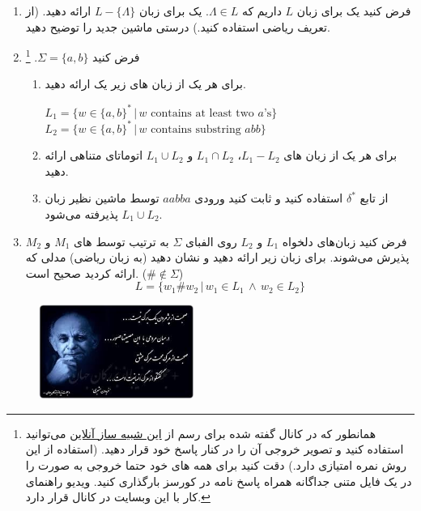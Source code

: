 \documentclass{article}
\begin{document}
	\begin{enumerate}
		\item 
		فرض کنید یک  برای زبان $L$ داریم که $\Lambda \in L $. یک  برای زبان 
		 $L-\{\Lambda\}$
		  ارائه دهید. (از تعریف ریاضی  استفاده کنید.) درستی ماشین جدید را توضیح دهید.
		\item 
		فرض کنید $\Sigma = \{a, b \}$. 
		\footnote{
			همانطور که در کانال گفته شده برای رسم
		از
		\href{https://automatonsimulator.com/}{این شبیه ساز آنلاین}
		می‌توانید استفاده کنید و تصویر خروجی آن را در کنار پاسخ خود قرار دهید. (استفاده از این روش نمره امتیازی دارد.) دقت کنید برای همه های خود حتما خروجی به صورت
		را در یک فایل متنی جداگانه همراه پاسخ نامه در کورسز بارگذاری کنید. ویدیو راهنمای کار با این وبسایت در کانال قرار دارد.
		}
		\begin{enumerate}
			\item 
			برای هر یک از زبان های زیر یک  ارائه دهید.
			\begin{latin}
				$L_1 = \{w \in \{a,b\}^* \, | \, \text{$w$ contains at least two $a$'s} \} $
				\\
				$L_2 = \{w \in \{a,b\}^* \, | \, \text{$w$ contains substring $abb$} \} $
			\end{latin}
		
			\item 
			برای هر یک از زبان های 
			$L_1 - L_2$، 
			$L_1 \cap L_2$
			و
			$L_1 \cup L_2$
			اتوماتای متناهی ارائه دهید.
			\item 
			از تابع 
			$\delta^*$
			استفاده کنید و ثابت کنید ورودی $aabba$ توسط ماشین نظیر زبان $L_1 \cup L_2$ پذیرفته می‌شود.			
		\end{enumerate}
	

		\item 
		فرض کنید زبان‌های دلخواه $L_1$ و $L_2$ روی الفبای $\Sigma$ به ترتیب توسط های $M_1$ و $ M_2 $ پذیرش می‌شوند. برای زبان زیر  ارائه دهید و نشان دهید (به زبان ریاضی) مدلی که ارائه کردید صحیح است. ($ \# \notin \Sigma $)
		   	$$L = \{ w_1 \# w_2 \, | \, w_1  \in L_1 \, \land \, w_2 \in L_2 \}$$
		
	\end{enumerate}
	
	\begin{figure}[h]
		\centering
		\includegraphics[width=0.45\textwidth]{image}
	\end{figure}
\end{document}
